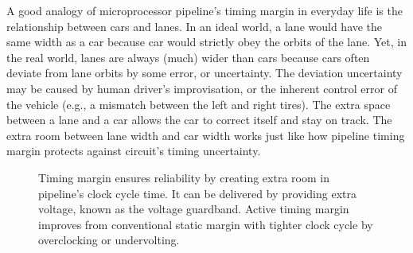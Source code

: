 A good analogy of microprocessor pipeline's timing margin in everyday life is the relationship between cars and lanes. In an ideal world, a lane would have the same width as a car because car would strictly obey the orbits of the lane. Yet, in the real world, lanes are always (much) wider than cars because cars often deviate from lane orbits by some error, or uncertainty. The deviation uncertainty may be caused by human driver's improvisation, or the inherent control error of the vehicle (e.g., a mismatch between the left and right tires). The extra space between a lane and a car allows the car to correct itself and stay on track. The extra room between lane width and car width works just like how pipeline timing margin protects against circuit's timing uncertainty.

\begin{figure}[t]
\centering
{}
\hfill
{}
\hfill
{}
\caption{Timing margin ensures reliability by creating extra room in pipeline's clock cycle time. It can be delivered by providing extra voltage, known as the voltage guardband. Active timing margin improves from conventional static margin with tighter clock cycle by overclocking or undervolting.}
\end{figure}

